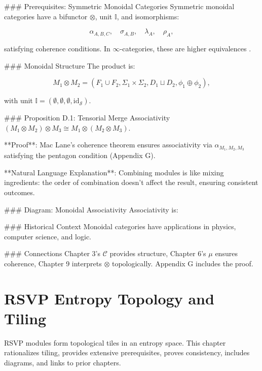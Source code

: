 \documentclass[12pt]{article}
\begin{document}
{### Prerequisites: Symmetric Monoidal Categories
Symmetric monoidal categories \cite{mac2013categories} have a bifunctor $\otimes$, unit $\mathbb{I}$, and isomorphisms:

\[
\alpha_{A,B,C}, \quad \sigma_{A,B}, \quad \lambda_A, \quad \rho_A,
\]

satisfying coherence conditions. In $\infty$-categories, these are higher equivalences \cite{lurie2009higher}.

### Monoidal Structure
The product is:

\[
M_1 \otimes M_2 = (F_1 \cup F_2, \Sigma_1 \times \Sigma_2, D_1 \sqcup D_2, \phi_1 \oplus \phi_2),
\]

with unit $\mathbb{I} = (\emptyset, \emptyset, \emptyset, \text{id}_\mathcal{S})$.

### Proposition D.1: Tensorial Merge Associativity
$(M_1 \otimes M_2) \otimes M_3 \cong M_1 \otimes (M_2 \otimes M_3)$.

**Proof**: Mac Lane’s coherence theorem ensures associativity via $\alpha_{M_1, M_2, M_3}$ satisfying the pentagon condition \cite{lurie2009higher} (Appendix G).

**Natural Language Explanation**: Combining modules is like mixing ingredients: the order of combination doesn’t affect the result, ensuring consistent outcomes.

### Diagram: Monoidal Associativity
Associativity is:

\begin{center}
\end{center}

### Historical Context
Monoidal categories have applications in physics, computer science, and logic.

### Connections
Chapter 3’s $\mathcal{C}$ provides structure, Chapter 6’s $\mu$ ensures coherence, Chapter 9 interprets $\otimes$ topologically. Appendix G includes the proof.

\section{RSVP Entropy Topology and Tiling}
\label{sec:chapter9}

RSVP modules form topological tiles in an entropy space. This chapter rationalizes tiling, provides extensive prerequisites, proves consistency, includes diagrams, and links to prior chapters.

}
\end{document}
